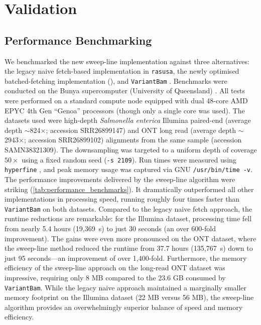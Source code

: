 \documentclass[a4paper,num-refs,gigabyte]{oup-contemporary}
\begin{document}
\section{Validation}

\subsection{Performance Benchmarking}
We benchmarked the new sweep-line implementation against three alternatives: the legacy naive fetch-based implementation in \texttt{rasusa}, the newly optimised batched-fetching implementation (), and \texttt{VariantBam} \cite{wala_variantbam_2016}. Benchmarks were conducted on the Bunya supercomputer (University of Queensland) \citep{the_university_of_queensland_research_computing_centre_bunya_2024}. All tests were performed on a standard compute node equipped with dual 48-core AMD EPYC 4th Gen ``Genoa'' processors (though only a single core was used). The datasets used were high-depth \textit{Salmonella enterica} Illumina paired-end (average depth $\sim$824$\times$; accession SRR26899147) and ONT long read (average depth $\sim$2943$\times$; accession SRR26899102) alignments from the same sample (accession SAMN38321309). The downsampling was targeted to a uniform depth of coverage $50\times$ using a fixed random seed (\texttt{-s 2109}). Run times were measured using \texttt{hyperfine} \citep{peter_hyperfine_2023}, and peak memory usage was captured via GNU \texttt{\//usr\//bin\//time -v}. The performance improvements delivered by the sweep-line algorithm were striking (\autoref{tab:performance_benchmarks}). It dramatically outperformed all other implementations in processing speed, running roughly four times faster than \texttt{VariantBam} on both datasets. Compared to the legacy naive fetch approach, the runtime reductions are remarkable: for the Illumina dataset, processing time fell from nearly 5.4 hours (19,369~s) to just 30 seconds (an over 600-fold improvement). The gains were even more pronounced on the ONT dataset, where the sweep-line method reduced the runtime from 37.7 hours (135,767~s) down to just 95 seconds---an improvement of over 1,400-fold. Furthermore, the memory efficiency of the sweep-line approach on the long-read ONT dataset was impressive, requiring only 8 MB compared to the 23.6 GB consumed by \texttt{VariantBam}. While the legacy naive approach maintained a marginally smaller memory footprint on the Illumina dataset (22 MB versus 56 MB), the sweep-line algorithm provides an overwhelmingly superior balance of speed and memory efficiency.
\end{document}
